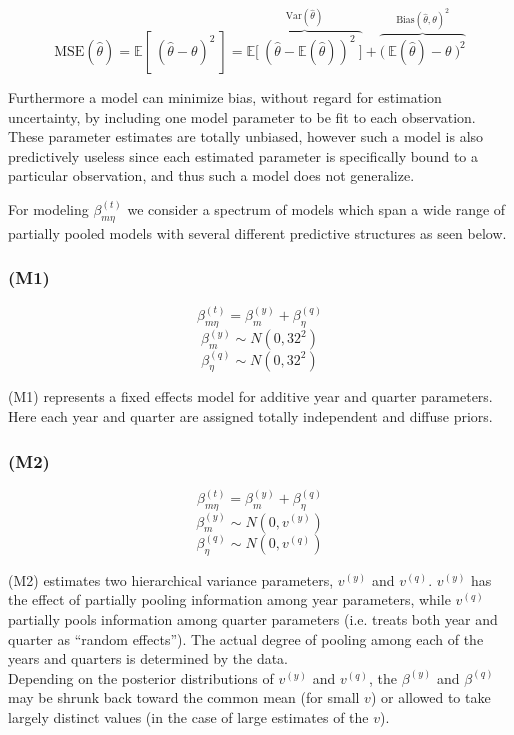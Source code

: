 \documentclass[12pt]{article}
\begin{document}
\[\text{MSE}(\hat\theta) = \mathbb{E}\left[~(\hat\theta - \theta)^2~\right] = \overbrace{\mathbb{E}\Big[~\left(\hat\theta-\mathbb{E}(\hat\theta)\right)^2~\Big]}^{\text{Var}(\hat \theta)} + \overbrace{\Big(~\mathbb{E}(\hat\theta)-\theta~\Big)^2}^{\text{Bias}(\hat \theta, \theta)^2}\]

Furthermore a model can minimize bias, without regard for estimation
uncertainty, by including one model parameter to be fit to each
observation. These parameter estimates are totally unbiased, however
such a model is also predictively useless since each estimated parameter
is specifically bound to a particular observation, and thus such a model does not generalize.

For modeling \(\beta^{(t)}_{m\eta}\) we consider a spectrum of models
which span a wide range of partially pooled models with several
different predictive structures as seen below.

\subsubsection{(M1)}\label{m1}

\[\beta^{(t)}_{m\eta} = \beta^{(y)}_{m} + \beta^{(q)}_{\eta}\]
\[\beta^{(y)}_{m} \sim N(0, 32^2)\]
\[\beta^{(q)}_{\eta} \sim N(0, 32^2)\]

(M1) represents a fixed effects model for additive year and quarter
parameters. Here each year and quarter are assigned totally independent
and diffuse priors.

\subsubsection{(M2)}\label{m2}

\[\beta^{(t)}_{m\eta} = \beta^{(y)}_{m} + \beta^{(q)}_{\eta}\]
\[\beta^{(y)}_{m} \sim N(0, v^{(y)})\]
\[\beta^{(q)}_{\eta} \sim N(0, v^{(q)})\]

(M2) estimates two hierarchical variance parameters, \(v^{(y)}\) and
\(v^{(q)}\). \(v^{(y)}\) has the effect of partially pooling information
among year parameters, while \(v^{(q)}\) partially pools information
among quarter parameters (i.e. treats both year and quarter as ``random
effects''). The actual degree of pooling among each of the years and
quarters is determined by the data.\\
Depending on the posterior distributions of \(v^{(y)}\) and \(v^{(q)}\),
the \(\beta^{(y)}\) and \(\beta^{(q)}\) may be shrunk back toward the
common mean (for small \(v\)) or allowed to take largely distinct values
(in the case of large estimates of the \(v\)).
\end{document}
